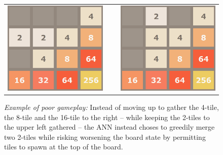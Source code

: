 \begin{figure}[!h]
\centering
\begin{tabularx}{\textwidth}{cXc}
\includegraphics[scale=0.35]{bad_1} & ~ & \includegraphics[scale=0.35]{bad_2} \\
\end{tabularx}
\caption{\textit{Example of poor gameplay:} Instead of moving up to gather the 4-tile, the 8-tile and the 16-tile to the right -- while keeping the 2-tiles to the upper left gathered -- the \ac{ANN} instead choses to greedily merge two 2-tiles while risking worsening the board state by permitting tiles to spawn at the top of the board.}
\label{fig:N1}
\end{figure}

